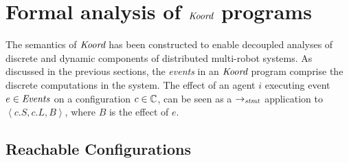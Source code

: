 \section{Formal analysis of $\emph{Koord}$ programs}
\label{sec:verification}
The semantics of $\emph{Koord}$ has been constructed to enable decoupled analyses of discrete and dynamic components of distributed multi-robot systems. As discussed in the previous sections, the \emph{events} in an $\emph{Koord}$ program comprise the discrete computations in the system. The effect of an agent $i$ executing event $e\in \mathit{Events}$ on a configuration $c\in \mathbb{C}$, can be seen as a $\rightarrow_\mathit{stmt}$ application to  $\left\langle c.S, c.L, B \right\rangle $, where $B$ is the effect of $e$.

\subsection{Reachable Configurations}

